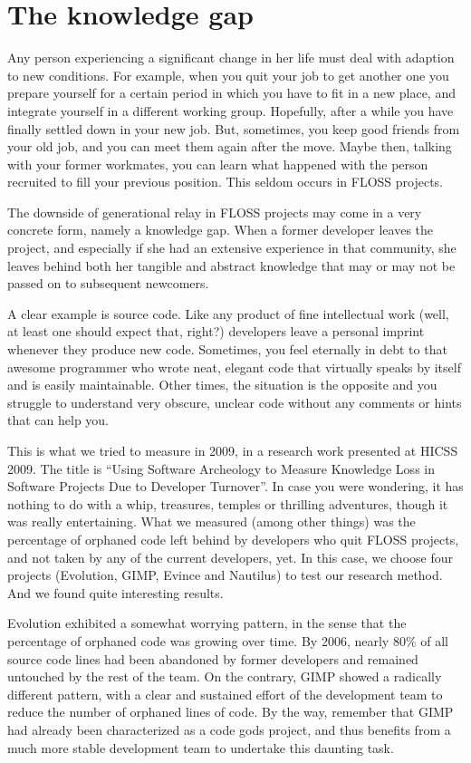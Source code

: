 \section*{The knowledge gap}

Any person experiencing a significant change in her life must deal with adaption
to new conditions. For example, when you quit your job to get another one you
prepare yourself for a certain period in which you have to fit in a new place,
and integrate yourself in a different working group. Hopefully, after a while
you have finally settled down in your new job. But, sometimes, you keep good
friends from your old job, and you can meet them again after the move. Maybe
then, talking with your former workmates, you can learn what happened with the
person recruited to fill your previous position. This seldom occurs in FLOSS
projects.

The downside of generational relay in FLOSS projects may come in a very concrete
form, namely a knowledge gap. When a former developer leaves the project, and
especially if she had an extensive experience in that community, she leaves
behind both her tangible and abstract knowledge that may or may not be passed
on to subsequent newcomers.

A clear example is source code. Like any product of fine intellectual work
(well, at least one should expect that, right?) developers leave a personal
imprint whenever they produce new code. Sometimes, you feel eternally in debt to
that awesome programmer who wrote neat, elegant code that virtually speaks by
itself and is easily maintainable. Other times, the situation is the opposite
and you struggle to understand very obscure, unclear code without any comments
or hints that can help you.

This is what we tried to measure in 2009, in a research work presented at HICSS
2009. The title is ``Using Software Archeology to Measure Knowledge Loss in
Software Projects Due to Developer Turnover''. In case you were wondering, it has
nothing to do with a whip, treasures, temples or thrilling adventures, though it
was really entertaining. What we measured (among other things) was the
percentage of orphaned code left behind by developers who quit FLOSS projects,
and not taken by any of the current developers, yet. In this case, we choose
four projects (Evolution, GIMP, Evince and Nautilus) to test our research
method. And we found quite interesting results.

Evolution exhibited a somewhat worrying pattern, in the sense that the
percentage of orphaned code was growing over time. By 2006, nearly 80\% of all
source code lines had been abandoned by former developers and remained untouched
by the rest of the team. On the contrary, GIMP showed a radically different
pattern, with a clear and sustained effort of the development team to reduce the
number of orphaned lines of code. By the way, remember that GIMP had already
been characterized  as a code gods project, and thus benefits from a much more
stable development team to undertake this daunting task.

